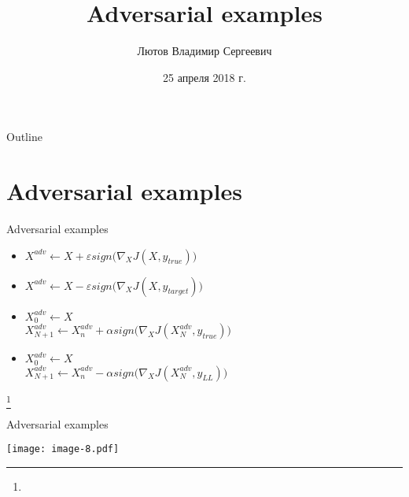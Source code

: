 \documentclass[14pt,mathserif,aspectratio=43,unicode]{beamer}
\title{Adversarial examples}
\author{Лютов Владимир Сергеевич}
\institute{
    \small{ВМК МГУ}

    \smallskip

    \texttt{[image: lab\_logo.eps]}
}
\date{\small{25 апреля 2018 г.}}
\newcommand\articlenote[1]{%
  \begingroup%
  \renewcommand\thefootnote{}\footnote{#1}%
  \addtocounter{footnote}{-1}%
  \endgroup%
}
\begin{document}
\begin{frame}[plain]
    \titlepage
\end{frame}

\begin{frame}{Outline}
    \tableofcontents
\end{frame}

\section{Adversarial examples}

\begin{frame}{Adversarial examples}

    \begin{itemize}
        \item $X^{adv} \gets X + \varepsilon sign\big(\nabla_X J(X, y_{true})\big)$
        \item $X^{adv} \gets X - \varepsilon sign\big(\nabla_X J(X, y_{target})\big)$
        \item $X_0^{adv} \gets X$ \\
        $X_{N+1}^{adv} \gets X_n^{adv} + \alpha sign\big(\nabla_X J(X_N^{adv}, y_{true})\big)$
        
        \item $X_0^{adv} \gets X$ \\
        $X_{N+1}^{adv} \gets X_n^{adv} - \alpha sign\big(\nabla_X J(X_N^{adv}, y_{LL})\big)$
    \end{itemize}
    
    \articlenote{}
    
\end{frame}


\begin{frame}{Adversarial examples}

    \begin{center}
        \texttt{[image: image-8.pdf]}
    \end{center}
    
\end{frame}
\end{document}
